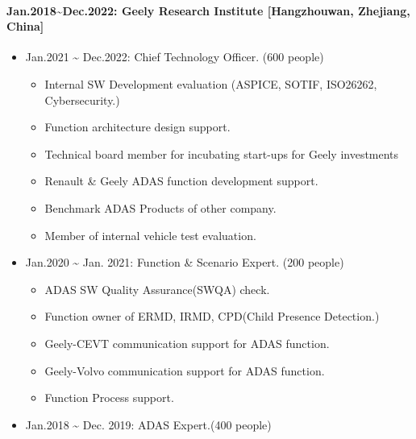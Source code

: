 \documentclass[12pt,a4paper]{article}
\begin{document}
\paragraph{Jan.2018{\textasciitilde}Dec.2022: Geely Research Institute [Hangzhouwan, Zhejiang, China]}
\begin{itemize}
\item Jan.2021 {\textasciitilde} Dec.2022: Chief Technology Officer. (600 people)

\begin{itemize}
\item Internal SW Development evaluation (ASPICE, SOTIF, ISO26262, Cybersecurity.)


\item Function architecture design support.


\item Technical board member for incubating start-ups for Geely investments


\item Renault \& Geely ADAS function development support.


\item Benchmark ADAS Products of other company.


\item Member of internal vehicle test evaluation.

\end{itemize}

\item Jan.2020 {\textasciitilde} Jan. 2021: Function \& Scenario Expert. (200 people)

\begin{itemize}
\item ADAS SW Quality Assurance(SWQA) check.


\item Function owner of ERMD, IRMD, CPD(Child Presence Detection.)


\item Geely-CEVT communication support for ADAS function.


\item Geely-Volvo communication support for ADAS function.


\item Function Process support. 

\end{itemize}

\item Jan.2018 {\textasciitilde} Dec. 2019: ADAS Expert.(400 people)


\end{itemize}
\end{document}

